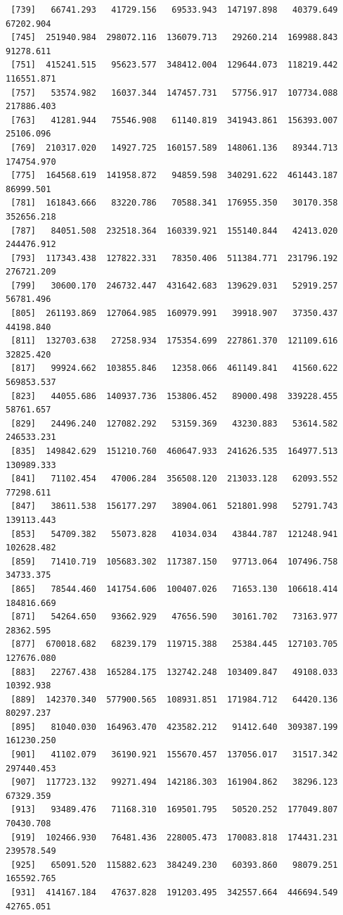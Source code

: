 \documentclass[
  letterpaper,
  DIV=11,
  numbers=noendperiod]{scrartcl}
\begin{document}
\begin{verbatim}
 [739]   66741.293   41729.156   69533.943  147197.898   40379.649   67202.904
 [745]  251940.984  298072.116  136079.713   29260.214  169988.843   91278.611
 [751]  415241.515   95623.577  348412.004  129644.073  118219.442  116551.871
 [757]   53574.982   16037.344  147457.731   57756.917  107734.088  217886.403
 [763]   41281.944   75546.908   61140.819  341943.861  156393.007   25106.096
 [769]  210317.020   14927.725  160157.589  148061.136   89344.713  174754.970
 [775]  164568.619  141958.872   94859.598  340291.622  461443.187   86999.501
 [781]  161843.666   83220.786   70588.341  176955.350   30170.358  352656.218
 [787]   84051.508  232518.364  160339.921  155140.844   42413.020  244476.912
 [793]  117343.438  127822.331   78350.406  511384.771  231796.192  276721.209
 [799]   30600.170  246732.447  431642.683  139629.031   52919.257   56781.496
 [805]  261193.869  127064.985  160979.991   39918.907   37350.437   44198.840
 [811]  132703.638   27258.934  175354.699  227861.370  121109.616   32825.420
 [817]   99924.662  103855.846   12358.066  461149.841   41560.622  569853.537
 [823]   44055.686  140937.736  153806.452   89000.498  339228.455   58761.657
 [829]   24496.240  127082.292   53159.369   43230.883   53614.582  246533.231
 [835]  149842.629  151210.760  460647.933  241626.535  164977.513  130989.333
 [841]   71102.454   47006.284  356508.120  213033.128   62093.552   77298.611
 [847]   38611.538  156177.297   38904.061  521801.998   52791.743  139113.443
 [853]   54709.382   55073.828   41034.034   43844.787  121248.941  102628.482
 [859]   71410.719  105683.302  117387.150   97713.064  107496.758   34733.375
 [865]   78544.460  141754.606  100407.026   71653.130  106618.414  184816.669
 [871]   54264.650   93662.929   47656.590   30161.702   73163.977   28362.595
 [877]  670018.682   68239.179  119715.388   25384.445  127103.705  127676.080
 [883]   22767.438  165284.175  132742.248  103409.847   49108.033   10392.938
 [889]  142370.340  577900.565  108931.851  171984.712   64420.136   80297.237
 [895]   81040.030  164963.470  423582.212   91412.640  309387.199  161230.250
 [901]   41102.079   36190.921  155670.457  137056.017   31517.342  297440.453
 [907]  117723.132   99271.494  142186.303  161904.862   38296.123   67329.359
 [913]   93489.476   71168.310  169501.795   50520.252  177049.807   70430.708
 [919]  102466.930   76481.436  228005.473  170083.818  174431.231  239578.549
 [925]   65091.520  115882.623  384249.230   60393.860   98079.251  165592.765
 [931]  414167.184   47637.828  191203.495  342557.664  446694.549   42765.051

\end{verbatim}
\end{document}
